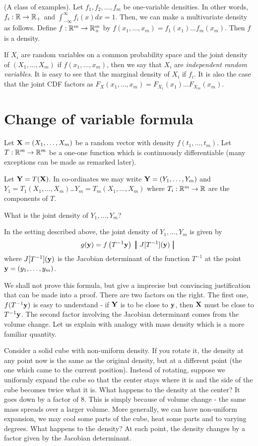 \documentclass[preprint,  11pt]{amsart}
\def\X{{\bf X}}
\def\Y{{\bf Y}}
\begin{document}
\beg (A class of examples). Let $f_{1},f_{2},\ldots ,f_{m}$ be one-variable densities. In other words, $f_{i}:\mathbb{R}\rightarrow \mathbb{R}_{+}$ and $\int_{-\infty}^{\infty}f_{i}(x)dx=1$. Then, we can make a multivariate density as follows. Define $f:\mathbb{R}^{m}\rightarrow \mathbb{R}_{+}^{m}$ by $f(x_{1},\ldots ,x_{m})=f_{1}(x_{1})\ldots f_{m}(x_{m})$. Then $f$ is a density.

If $X_{i}$ are random variables on a common probability space and the joint density of $(X_{1},\ldots ,X_{m})$  if $f(x_{1},\ldots ,x_{m})$, then we say that $X_{i}$ are {\em independent random variables}. It is easy to see that the marginal density of $X_{i}$ if $f_{i}$. It is also the case that the joint CDF factors as $F_{X}(x_{1},\ldots ,x_{m})=F_{X_{1}}(x_{1})\ldots F_{X_{m}}(x_{m})$. 
\eeg
\section{Change of variable formula}
Let $\X=(X_{1},\ldots ,X_{m})$ be a random vector with density $f(t_{1},\ldots ,t_{m})$. Let $T:\mathbb{R}^{m}\rightarrow \mathbb{R}^{m}$ be a one-one function which is continuously differentiable (many exceptions can be made as remarked later). 

Let $\Y=T(\X)$. In co-ordinates we may write $\Y=(Y_{1},\ldots ,Y_{m})$ and $Y_{1}=T_{1}(X_{1},\ldots ,X_{m})$\dots $Y_{m}=T_{m}(X_{1},\ldots ,X_{m})$ where $T_{i}:\mathbb{R}^{m}\rightarrow \mathbb{R}$ are the components of $T$. 

 What is the joint density of $Y_{1},\ldots ,Y_{m}$?

 In the setting described above,  the joint density of $Y_{1},\ldots ,Y_{m}$ is given by
$$
g({\bf y})=f\left(T^{-1}{\bf y}\right)\ \pmb{\big|} \  J[T^{-1}]({\bf y})\ \pmb{\big|} \ 
$$
where $J[T^{-1}]({\bf y})$ is the Jacobian determinant of the function $T^{-1}$ at the point ${\bf y}=(y_{1},\ldots ,y_{m})$.

 We shall not prove this formula, but give a imprecise but convincing justification that can be made into a proof. There are two factors on the right.  The first one, $f(T^{-1}{\bf y})$ is easy to understand - if $\Y$ is to be close to ${\bf y}$, then $\X$ must be close to $T^{-1}{\bf y}$. The second factor involving the Jacobian determinant comes from the volume change. Let us explain with analogy with mass density which is a more familiar quantity.

Consider a solid cube with non-uniform density. If you rotate it, the density at any point now is the same as the original density, but at a different point (the one which came to the current position). Instead of rotating, suppose we uniformly expand the cube so that the center stays where it is and the side of the cube becomes twice what it is. What happens to the density at the center? It goes down by a factor of $8$. This is simply because of volume change - the same mass spreads over a larger volume. More generally, we can have non-uniform expansion, we may cool some parts of the cube, heat some parts and to varying degrees. What happens to the density? At each point, the density changes by a factor given by the Jacobian determinant.
\end{document}

